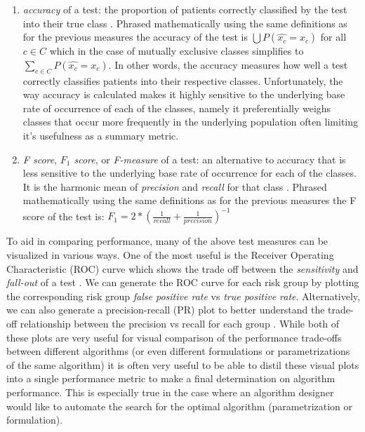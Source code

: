 \documentclass[]{article}
\begin{document}
\begin{enumerate}[label=\alph*)]
	\item \textit{accuracy} of a test: the proportion of patients correctly classified by the test into their true class \cite{Flach2004,MedCalc2017,Sokolova2009,Forman2010,VanAsch2013}. Phrased mathematically using the same definitions as for the previous measures the accuracy of the test is $\bigcup P(\hat{x_c} = x_c)$ for all $c\in C$ which in the case of mutually exclusive classes simplifies to $\sum\limits_{c\in C}P(\hat{x_c} = x_c)$. In other words, the accuracy measures how well a test correctly classifies patients into their respective classes. Unfortunately, the way accuracy is calculated makes it highly sensitive to the underlying base rate of occurrence of each of the classes, namely it preferentially weighs classes that occur more frequently in the underlying population often limiting it's usefulness as a summary metric.
	\item \textit{F score}, \textit{$F_1$ score}, or \textit{F-measure} of a test: an alternative to accuracy that is less sensitive to the underlying base rate of occurrence for each of the classes. It is the harmonic mean of \textit{precision} and \textit{recall} for that class \cite{Flach2004,MedCalc2017,Sokolova2009,Forman2010,VanAsch2013}. Phrased mathematically using the same definitions as for the previous measures the F score of the test is: \newline$F_1 = 2*(\frac{1}{\textit{recall}} + \frac{1}{\textit{precision}})^{-1}$
\end{enumerate}

To aid in comparing performance, many of the above test measures can be visualized in various ways. One of the most useful is the Receiver Operating Characteristic (ROC) curve which shows the trade off between the \textit{sensitivity} and \textit{fall-out} of a test \cite{Davis2006,Sayad,Fieldsend2005,Flach2004,MedCalc2017,Gung2013}. We can generate the ROC curve for each risk group by plotting the corresponding risk group \textit{false positive rate} vs \textit{true positive rate}. Alternatively, we can also generate a precision-recall (PR) plot to better understand the trade-off relationship between the precision vs recall for each group \cite{Davis2006,Flach2004,MedCalc2017,Gung2013}. While both of these plots are very useful for visual comparison of the performance trade-offs between different algorithms (or even different formulations or parametrizations of the same algorithm) it is often very useful to be able to distil these visual plots into a single performance metric to make a final determination on algorithm performance. This is especially true in the case where an algorithm designer would like to automate the search for the optimal algorithm (parametrization or formulation).
\end{document}
